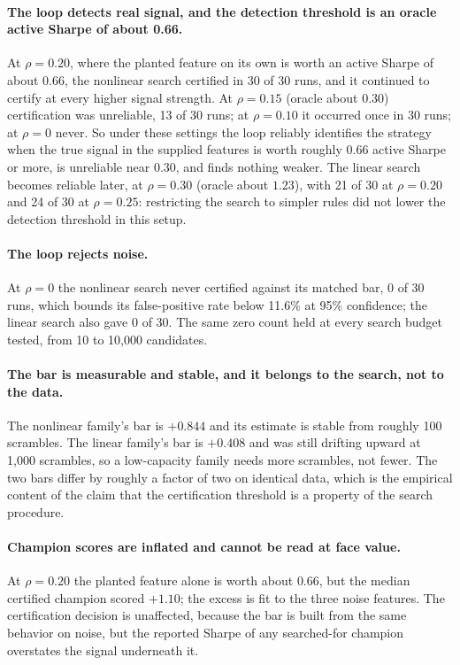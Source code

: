 \documentclass[11pt]{article}
\begin{document}
\paragraph{The loop detects real signal, and the detection threshold is an oracle active Sharpe of about
0.66.} At $\rho=0.20$, where the planted feature on its own is worth an active Sharpe of about $0.66$,
the nonlinear search certified in 30 of 30 runs, and it continued to certify at every higher signal
strength. At $\rho=0.15$ (oracle about $0.30$) certification was unreliable, 13 of 30 runs; at
$\rho=0.10$ it occurred once in 30 runs; at $\rho=0$ never. So under these settings the loop reliably
identifies the strategy when the true signal in the supplied features is worth roughly $0.66$ active
Sharpe or more, is unreliable near $0.30$, and finds nothing weaker. The linear search becomes reliable
later, at $\rho=0.30$ (oracle about $1.23$), with 21 of 30 at $\rho=0.20$ and 24 of 30 at $\rho=0.25$:
restricting the search to simpler rules did not lower the detection threshold in this setup.

\paragraph{The loop rejects noise.} At $\rho=0$ the nonlinear search never certified against its matched
bar, 0 of 30 runs, which bounds its false-positive rate below 11.6\% at 95\% confidence; the linear
search also gave 0 of 30. The same zero count held at every search budget tested, from 10 to 10{,}000
candidates.

\paragraph{The bar is measurable and stable, and it belongs to the search, not to the data.} The
nonlinear family's bar is $+0.844$ and its estimate is stable from roughly 100 scrambles. The linear
family's bar is $+0.408$ and was still drifting upward at 1{,}000 scrambles, so a low-capacity family
needs more scrambles, not fewer. The two bars differ by roughly a factor of two on identical data, which
is the empirical content of the claim that the certification threshold is a property of the search
procedure.

\paragraph{Champion scores are inflated and cannot be read at face value.} At $\rho=0.20$ the planted
feature alone is worth about $0.66$, but the median certified champion scored $+1.10$; the excess is fit
to the three noise features. The certification decision is unaffected, because the bar is built from the
same behavior on noise, but the reported Sharpe of any searched-for champion overstates the signal
underneath it.
\end{document}
